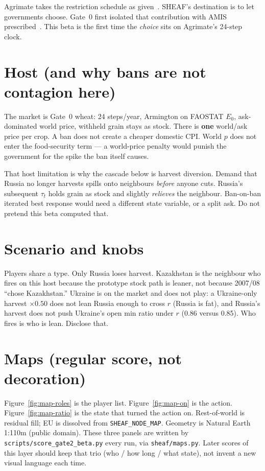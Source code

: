 \documentclass[11pt,a4paper]{article}
\begin{document}
Agrimate takes the restriction schedule as given~\citep{kuhla2025}. SHEAF's
destination is to let governments choose. Gate~0 first isolated that
contribution with AMIS prescribed~\citep{amis_oecd}. This beta is the first
time the \emph{choice} sits on Agrimate's 24-step clock.

\section{Host (and why bans are not contagion here)}
\label{sec:host}

The market is Gate~0 wheat: 24 steps/year, Armington on FAOSTAT \(E_0\),
ask-dominated world price, withheld grain stays as stock. There is
\textbf{one} world/ask price per crop. A ban does not create a cheaper
domestic CPI. World \(p\) does not enter the food-security term --- a
world-price penalty would punish the government for the spike the ban
itself causes.

That host limitation is why the cascade below is harvest diversion.
Demand that Russia no longer harvests spills onto neighbours
\emph{before} anyone cuts. Russia's subsequent \(\tau_t\) holds grain as
stock and slightly \emph{relieves} the neighbour. Ban-on-ban iterated best
response would need a different state variable, or a split ask. Do not
pretend this beta computed that.



\section{Scenario and knobs}
\label{sec:knobs}



Players share a type. Only Russia loses harvest. Kazakhstan is the neighbour
who fires on this host because the prototype stock path is leaner, not
because 2007/08 ``chose Kazakhstan.'' Ukraine is on the market and does
not play: a Ukraine-only harvest \(\times 0.50\) does not lean Russia
enough to cross \(r\) (Russia is fat), and Russia's harvest does not push
Ukraine's open min ratio under \(r\) (0.86 versus 0.85). Who fires is who
is lean. Disclose that.

\section{Maps (regular score, not decoration)}
\label{sec:maps}

Figure~\ref{fig:map-roles} is the player list. Figure~\ref{fig:map-on} is
the action. Figure~\ref{fig:map-ratio} is the state that turned the action
on. Rest-of-world is residual fill; EU is dissolved from
\texttt{SHEAF\_NODE\_MAP}. Geometry is Natural Earth 1:110m (public domain).
These three panels are written by \texttt{scripts/score\_gate2\_beta.py}
every run, via \texttt{sheaf/maps.py}. Later scores of this layer should
keep that trio (who / how long / what state), not invent a new visual
language each time.
\end{document}

